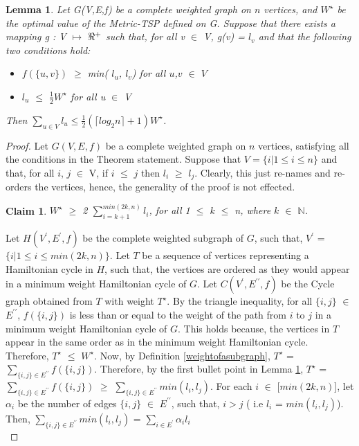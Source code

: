 \documentclass[12pt]{article}
\newtheorem{lemma}[definition]{Lemma}
\newtheorem{claim}{Claim}
\numberwithin{equation}{subsection}
\numberwithin{table}{subsection}
\numberwithin{algorithm}{subsection}
\begin{document}
\begin{lemma}
\label{to_proove_bound}
Let G(V,E,f) be a complete weighted graph on $n$ vertices, and $W^\star$ be the optimal value of the Metric-TSP defined on G. Suppose that there exists a mapping g : V $\mapsto$ $\real^+$ such that, for all v $\in$ V, g(v) = $l_v$ and that the following  two conditions hold:
\begin{itemize}
\item $f(\{u, v\})$ $\geq$ min( $l_u$, $l_v$) for all $u$,$v$ $\in$ $V$
\item $l_u$ $\leq$ $\frac{1}{2}W^\star$ for all u $\in$ V
\end{itemize}
Then $\sum_{u \in V} l_u \leq \frac{1}{2}(\lceil log_2 n \rceil + 1)W^\star$. {}
\end{lemma}
\begin{proof}
Let $G(V,E,f)$ be a complete weighted graph on $n$ vertices, satisfying all the conditions in the Theorem statement. Suppose that $V=\{i | 1 \leq i \leq n\}$ and that, for all $i$, $j$ $\in$ V, if $i$ $\leq$ $j$ then $l_i$ $\geq$ $l_j$. Clearly, this just re-names and re-orders the vertices, hence, the generality of the proof is not effected.
\begin{claim}
\label{claim1}
$W^\star$ $\geq$ 2 $\sum_{i = k+1}^{min(2k, n)} l_i$, for all 1 $\leq$ $k$ $\leq$ n, where $k$ $\in$ $\mathbb{N}$.
\end{claim}
Let $H(V^\prime,E^\prime,f)$ be the complete weighted subgraph of $G$, such that, $V^\prime$ = $\{i | 1 \leq i \leq min(2k, n)\}$. Let $T$ be a sequence of vertices representing a Hamiltonian cycle in $H$, such that, the vertices are ordered as they would appear in a minimum weight Hamiltonian cycle of $G$. Let $C(V^\prime, E^{\prime\prime}, f)$ be the Cycle graph obtained from $T$ with weight $T^\star$. By the triangle inequality, for all $\{i, j\}$ $\in$ $E^{\prime\prime}$, $f(\{i, j\})$ is less than or equal to the weight of the path from $i$ to $j$ in a minimum weight Hamiltonian cycle of $G$. This holds because, the vertices in $T$ appear in the same order as in the minimum weight Hamiltonian cycle. Therefore, $T^\star$ $\leq$ $W^\star$. Now, by Definition \ref{weightofasubgraph}, $T^\star$ =  $\sum_{\{i, j\} \in E^{\prime\prime}} f(\{i, j\})$. Therefore, by the first bullet point in Lemma \ref{to_proove_bound},  $T^\star$ = $\sum_{\{i, j\} \in E^{\prime\prime}} f(\{i, j\})$ $\geq$  $\sum_{\{i, j\} \in E^{\prime\prime}} min(l_i, l_j)$. For each $i$ $\in$ [$min(2k, n)$], let $\alpha_i$ be the number of edges $\{i, j\}$ $\in$ $E^{\prime\prime}$, such that, $i > j$ ( i.e $l_i$ = $min(l_i, l_j)$). Then, $\sum_{\{i, j\} \in E^{\prime\prime}} min(l_i, l_j)$ = $\sum_{i \in E^\prime} \alpha_il_i$\\

\end{proof}
\end{document}
